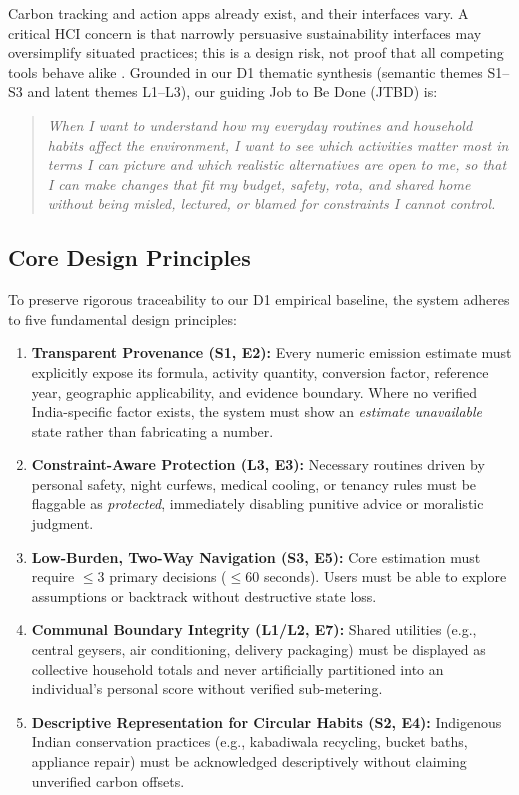 \documentclass[12pt,a4paper]{article}
\begin{document}
Carbon tracking and action apps already exist, and their interfaces vary. A critical HCI concern is that narrowly persuasive sustainability interfaces may oversimplify situated practices; this is a design risk, not proof that all competing tools behave alike \cite{brynjarsdottir2012}. Grounded in our D1 thematic synthesis (semantic themes S1--S3 and latent themes L1--L3), our guiding Job to Be Done (JTBD) is:
\begin{quote}
\itshape
When I want to understand how my everyday routines and household habits affect the environment, I want to see which activities matter most in terms I can picture and which realistic alternatives are open to me, so that I can make changes that fit my budget, safety, rota, and shared home without being misled, lectured, or blamed for constraints I cannot control.
\end{quote}

\subsection{Core Design Principles}
To preserve rigorous traceability to our D1 empirical baseline, the system adheres to five fundamental design principles:
\begin{enumerate}[label=\textbf{DP\arabic*.},leftmargin=*]
  \item \textbf{Transparent Provenance (S1, E2):} Every numeric emission estimate must explicitly expose its formula, activity quantity, conversion factor, reference year, geographic applicability, and evidence boundary. Where no verified India-specific factor exists, the system must show an \emph{estimate unavailable} state rather than fabricating a number.
  \item \textbf{Constraint-Aware Protection (L3, E3):} Necessary routines driven by personal safety, night curfews, medical cooling, or tenancy rules must be flaggable as \emph{protected}, immediately disabling punitive advice or moralistic judgment.
  \item \textbf{Low-Burden, Two-Way Navigation (S3, E5):} Core estimation must require $\le 3$ primary decisions ($\le 60$ seconds). Users must be able to explore assumptions or backtrack without destructive state loss.
  \item \textbf{Communal Boundary Integrity (L1/L2, E7):} Shared utilities (e.g., central geysers, air conditioning, delivery packaging) must be displayed as collective household totals and never artificially partitioned into an individual's personal score without verified sub-metering.
  \item \textbf{Descriptive Representation for Circular Habits (S2, E4):} Indigenous Indian conservation practices (e.g., kabadiwala recycling, bucket baths, appliance repair) must be acknowledged descriptively without claiming unverified carbon offsets.
\end{enumerate}
\end{document}
